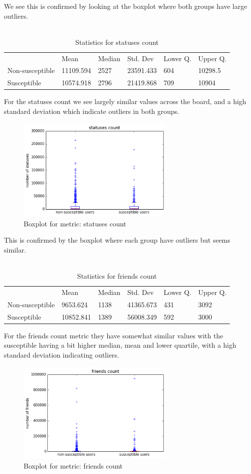 \documentclass[10pt]{IEEEtran}
\begin{document}
We see this is confirmed by looking at the boxplot where both groups have large outliers.\\\\
\begin{table}[ht!]
\begin{tabular}{llllll}
\textbf{}       & Mean      & Median & Std. Dev  & Lower Q. & Upper Q. \\
Non-susceptible & 11109.594 & 2527   & 23591.433 &  604  & 10298.5     \\
Susceptible     & 10574.918 & 2796   & 21419.868 & 709    &   10904    
\end{tabular}
\caption{Statistics for statuses count}
\end{table}
For the statuses count we see largely similar values across the board, and a high standard deviation which indicate outliers in both groups.
\begin{figure}[H]
  \centering
  \includegraphics[width=3.0in]{statuses_count_boxplot}
  \caption{Boxplot for metric: statuses count}
  \label{fig:statuses_boxplot}
\end{figure}
This is confirmed by the boxplot where each group have outliers but seems similar.\\\\
\begin{table}[ht!]
\begin{tabular}{llllll}
\textbf{}       & Mean      & Median & Std. Dev  & Lower Q. & Upper Q. \\
Non-susceptible & 9653.624  & 1138   & 41365.673 & 431     &  3092     \\
Susceptible     & 10852.841 & 1389   & 56008.349 & 592    &   3000   
\end{tabular}
\caption{Statistics for friends count}
\end{table}
For the friends count metric they have somewhat similar values with the susceptible having a bit higher median, mean and lower quartile, with a high standard deviation indicating outliers.
\begin{figure}[H]
  \centering
  \includegraphics[width=3.0in]{friends_boxplot}
  \caption{Boxplot for metric: friends count}
  \label{fig:friends_boxplot}
\end{figure}
\end{document}
